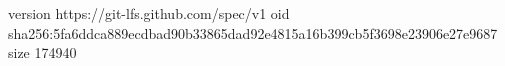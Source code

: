 version https://git-lfs.github.com/spec/v1
oid sha256:5fa6ddca889ecdbad90b33865dad92e4815a16b399cb5f3698e23906e27e9687
size 174940
